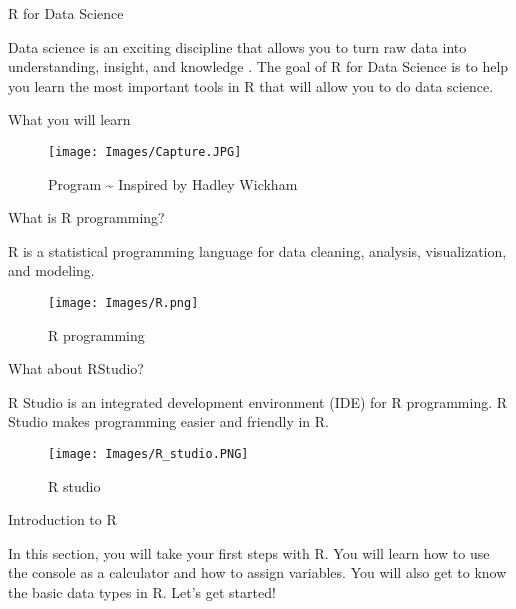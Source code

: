 \documentclass[
  ignorenonframetext,
]{beamer}
\begin{document}
\begin{frame}{R for Data Science}
\protect\hypertarget{r-for-data-science}{}

Data science is an exciting discipline that allows you to turn raw data
into understanding, insight, and knowledge \cite{P}. The goal of R for
Data Science is to help you learn the most important tools in R that
will allow you to do data science.

\end{frame}

\begin{frame}{What you will learn}
\protect\hypertarget{what-you-will-learn}{}

\begin{figure}
\centering
\texttt{[image: Images/Capture.JPG]}
\caption{Program \textasciitilde{} Inspired by Hadley Wickham \cite{P}}
\end{figure}
\end{frame}


\begin{frame}{What is R programming?}

R is a statistical programming language for data cleaning, analysis, visualization, and modeling.

\begin{figure}
	\centering
	\texttt{[image: Images/R.png]}
	\caption{R programming}
\end{figure}

\end{frame}


\begin{frame}{What about RStudio?}
	\protect\hypertarget{what-about-rstudio}{}

	R Studio is an integrated development environment (IDE) for R
	programming. R Studio makes programming easier and friendly in R.
	
	\begin{figure}
		\centering
		\texttt{[image: Images/R\_studio.PNG]}
		\caption{R studio}
	\end{figure}
	
\end{frame}


\begin{frame}{Introduction to R}
\protect\hypertarget{introduction-to-r}{}

In this section, you will take your first steps with R. You will learn
how to use the console as a calculator and how to assign variables. You
will also get to know the basic data types in R. Let's get started!

\end{frame}
\end{document}
